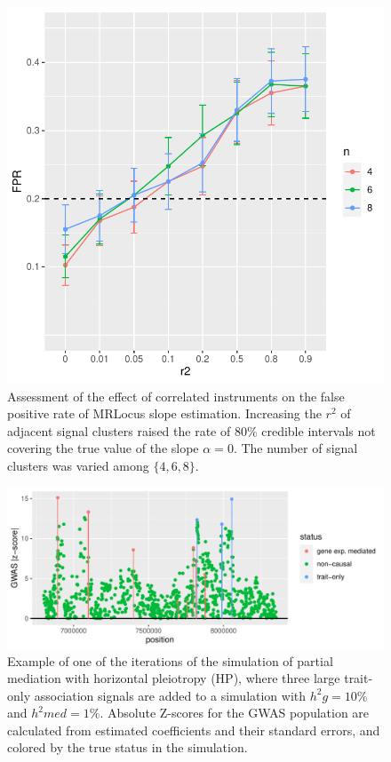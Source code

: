 \documentclass[11pt]{article}
\begin{document}
\begin{figure}[!ht]
  \centering
  \includegraphics[width=.5\textwidth]{figs/corr_instr_sim}
  \caption{Assessment of the effect of correlated instruments on the
    false positive rate of MRLocus slope estimation. Increasing the
    $r^2$ of adjacent signal clusters raised the rate of 80\% credible
    intervals not covering the true value of the slope $\alpha =
    0$. The number of signal clusters was varied among $\{4,6,8\}$.}
\end{figure}

\begin{figure}[!ht]
  \centering
  \includegraphics[width=.7\textwidth]{figs/hp_example}
  \caption{Example of one of the iterations of the simulation of
    partial mediation with horizontal pleiotropy (HP), where three
    large trait-only association signals are added to a simulation
    with $h^2g = 10\%$ and $h^2med = 1\%$. Absolute Z-scores for the
    GWAS population are calculated from estimated coefficients and
    their standard errors, and colored by the true status in the
    simulation.}
  \label{sf:hp}
\end{figure}
\end{document}
